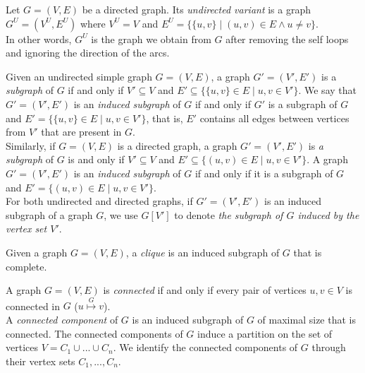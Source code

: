 \begin{definition}\label{def: undirected variant}
Let $G=(V,E)$ be a directed graph.
Its \emph{undirected variant} is a graph $G^U=(V^U,E^U)$ where 
$V^U=V$ and 
$E^U=\{ \{u,v\} \mid (u,v) \in E \wedge u \neq v\}$.\\
In other words, $G^U$ is the graph we obtain from $G$ after removing the self loops and ignoring the direction of the arcs.
\end{definition}


\begin{definition}[Subgraphs]
Given an undirected simple graph $G=(V,E)$, a graph $G'=(V',E')$ is a \emph{subgraph} of $G$ if and only if $V' \subseteq V$ and 
$E' \subseteq \{\{u,v\} \in E \mid u,v \in V'\}$.
We say that $G'=(V',E')$ is an \emph{induced subgraph} of $G$ if and only if $G'$ is a subgraph of $G$ and 
$E' = \{\{u,v\} \in E \mid u,v \in V'\}$, that is, $E'$ contains all edges between vertices from $V'$ that are present in $G$.\\ 
Similarly, if $G=(V,E)$ is a directed graph, a graph $G'=(V',E')$ is \emph{a subgraph} of $G$ is and only if $V' \subseteq V$ and 
$E' \subseteq \{(u,v) \in E \mid u,v \in V'\}$.
A graph $G'=(V',E')$ is an \emph{induced subgraph} of $G$ if and only if it is a subgraph of $G$ and 
$E' = \{(u,v) \in E \mid u,v \in V'\}$.\\
For both undirected and directed graphs, if $G'=(V',E')$ is an induced subgraph of a graph $G$, we use $G[V']$ to denote \emph{the subgraph of $G$ induced by the vertex set $V'$}.
\end{definition}


\begin{definition}[Clique]
Given a graph $G=(V,E)$, a \emph{clique} is an induced subgraph of $G$ that is complete.
\end{definition}


\begin{definition}
A graph $G=(V,E)$ is \emph{connected} if and only if every pair of vertices $u,v \in V$ is connected in $G$ ($u \overset{G}{\mapsto} v$).\\
A \emph{connected component} of $G$ is an induced subgraph of $G$ of maximal size that is connected.
The connected components of $G$ induce a partition on the set of vertices $V = C_1 \cup ... \cup C_n$.
We identify the connected components of $G$ through their vertex sets $C_1,...,C_n$.
\end{definition}


